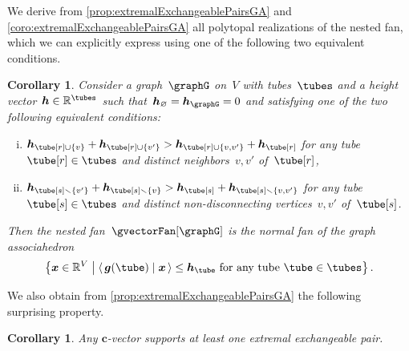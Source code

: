 \documentclass{amsart}
\newtheorem{corollary}[theorem]{Corollary}
\theoremstyle{definition}
\newcommand{\R}{\mathbb{R}} %
\renewcommand{\b}[1]{{\boldsymbol{#1}}} %
\newcommand{\set}[2]{\left\{ #1 \;\middle|\; #2 \right\}} %
\newcommand{\ssm}{\smallsetminus} %
\newcommand{\dotprod}[2]{\left\langle \, #1 \; \middle| \; #2 \, \right\rangle} %
\newcommand{\gvector}[1]{\b{g}(#1)} %
\newcommand{\ground}{V} %
\newcommand{\connectedComponents}{\kappa} %
\begin{document}
We derive from \cref{prop:extremalExchangeablePairsGA} and \cref{coro:extremalExchangeablePairsGA} all polytopal realizations of the nested fan, which we can explicitly express using one of the following two equivalent conditions.


\begin{corollary}
Consider a graph~$\graphG$ on~$\ground$ with tubes~$\tubes$ and a height vector~$\b{h} \in \R^{\tubes}$ such that~$\b{h}_{\varnothing} = \b{h}_{\graphG} = 0$ and satisfying one of the two following equivalent conditions:
\begin{enumerate}[(i)]
\item $\b{h}_{\tube[r] \cup \{v\}} + \b{h}_{\tube[r] \cup \{v'\}} > \b{h}_{\tube[r] \cup \{v, v'\}} + \b{h}_{\tube[r]}$ for any tube~$\tube[r] \in \tubes$ and distinct neighbors~$v,v'$ of~$\tube[r]$,
\item $\b{h}_{\tube[s] \ssm \{v'\}} + \b{h}_{\tube[s] \ssm \{v\}} > \b{h}_{\tube[s]} + \b{h}_{\tube[s] \ssm \{v, v'\}}$ for any tube~$\tube[s] \in \tubes$ and distinct non-disconnecting vertices~$v,v'$ of~$\tube[s]$.
\end{enumerate}
Then the nested fan~$\gvectorFan[\graphG]$ is the normal fan of the graph associahedron
\[
\set{\b{x} \in \R^\ground}{\dotprod{\gvector{\tube}}{\b{x}} \le \b{h}_{\tube} \text{ for any tube } \tube \in \tubes}.
\]
\end{corollary}

We also obtain from \cref{prop:extremalExchangeablePairsGA} the following surprising property.

\begin{corollary}
Any $\b{c}$-vector supports at least one extremal exchangeable pair.
\end{corollary}
\end{document}
